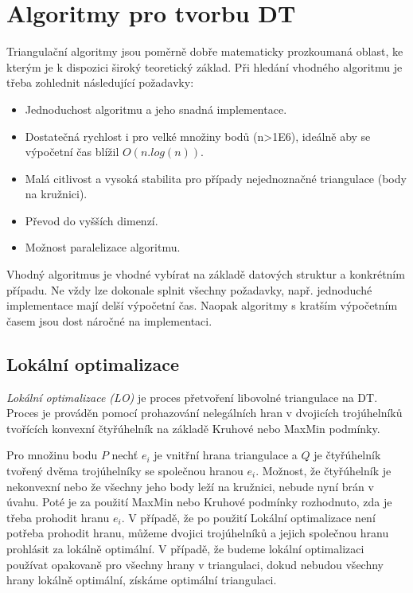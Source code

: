 \documentclass[12pt,a4paper]{article}
\begin{document}
{\section{Algoritmy pro tvorbu DT}
\label{sec:algoritmy}
Triangulační algoritmy jsou poměrně dobře matematicky prozkoumaná
oblast, ke kterým je k dispozici široký teoretický základ. Při hledání
vhodného algoritmu je třeba zohlednit následující požadavky:
\begin{itemize}
\item Jednoduchost algoritmu a jeho snadná implementace.
\item Dostatečná rychlost i pro velké množiny bodů (n>1E6), ideálně aby se výpočetní čas blížil $O(n . log(n))$.
\item Malá citlivost a vysoká stabilita pro případy nejednoznačné triangulace (body na kružnici).
\item Převod do vyšších dimenzí.
\item Možnost paralelizace algoritmu.
\end{itemize}
Vhodný algoritmus je vhodné vybírat na základě datových struktur a
konkrétním případu. Ne vždy lze dokonale splnit všechny požadavky,
např. jednoduché implementace mají delší výpočetní čas. Naopak
algoritmy s kratším výpočetním časem jsou dost náročné na
implementaci.

\newpage
\subsection{Lokální optimalizace}
\emph{Lokální optimalizace (LO)} je proces přetvoření libovolné
triangulace na DT. Proces je prováděn pomocí prohazování nelegálních
hran v dvojicích trojúhelníků tvořících konvexní čtyřúhelník na
základě Kruhové nebo MaxMin podmínky.

Pro množinu bodu $P$ nechť $e_i$ je vnitřní hrana triangulace a $Q$ je
čtyřúhelník tvořený dvěma trojúhelníky se společnou hranou
$e_i$. Možnost, že čtyřúhelník je nekonvexní nebo že všechny jeho body leží
na kružnici, nebude nyní brán v úvahu. Poté je za použití MaxMin nebo
Kruhové podmínky rozhodnuto, zda je třeba prohodit hranu $e_i$. V
případě, že po použití Lokální optimalizace není potřeba prohodit
hranu, můžeme dvojici trojúhelníků a jejich společnou hranu prohlásit
za lokálně optimální. V případě, že budeme lokální optimalizaci
používat opakovaně pro všechny hrany v triangulaci, dokud nebudou
všechny hrany lokálně optimální, získáme optimální triangulaci.

}
\end{document}

